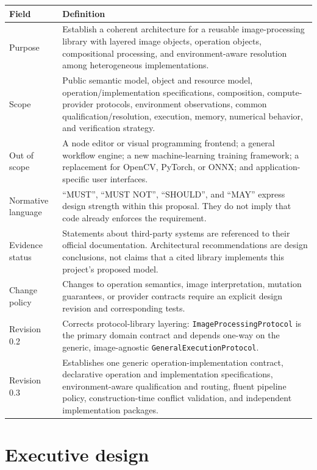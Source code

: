 \documentclass[11pt,a4paper,oneside]{article}
\begin{document}
\begin{longtable}{@{}L{0.22\textwidth}Z{0.72\textwidth}@{}}
\toprule
\textbf{Field} & \textbf{Definition} \\
\midrule
Purpose & Establish a coherent architecture for a reusable image-processing library with layered image objects, operation objects, compositional processing, and environment-aware resolution among heterogeneous implementations. \\
Scope & Public semantic model, object and resource model, operation/implementation specifications, composition, compute-provider protocols, environment observations, common qualification/resolution, execution, memory, numerical behavior, and verification strategy. \\
Out of scope & A node editor or visual programming frontend; a general workflow engine; a new machine-learning training framework; a replacement for OpenCV, PyTorch, or ONNX; and application-specific user interfaces. \\
Normative language & \textquotedblleft{}MUST\textquotedblright{}, \textquotedblleft{}MUST NOT\textquotedblright{}, \textquotedblleft{}SHOULD\textquotedblright{}, and \textquotedblleft{}MAY\textquotedblright{} express design strength within this proposal. They do not imply that code already enforces the requirement. \\
Evidence status & Statements about third-party systems are referenced to their official documentation. Architectural recommendations are design conclusions, not claims that a cited library implements this project's proposed model. \\
Change policy & Changes to operation semantics, image interpretation, mutation guarantees, or provider contracts require an explicit design revision and corresponding tests. \\
Revision 0.2 & Corrects protocol-library layering: \texttt{ImageProcessing\allowbreak Protocol} is the primary domain contract and depends one-way on the generic, image-agnostic \texttt{GeneralExecution\allowbreak Protocol}. \\ 
Revision 0.3 & Establishes one generic operation-implementation contract, declarative operation and implementation specifications, environment-aware qualification and routing, fluent pipeline policy, construction-time conflict validation, and independent implementation packages. \\
\bottomrule
\end{longtable}

\section{Executive design}
\end{document}
